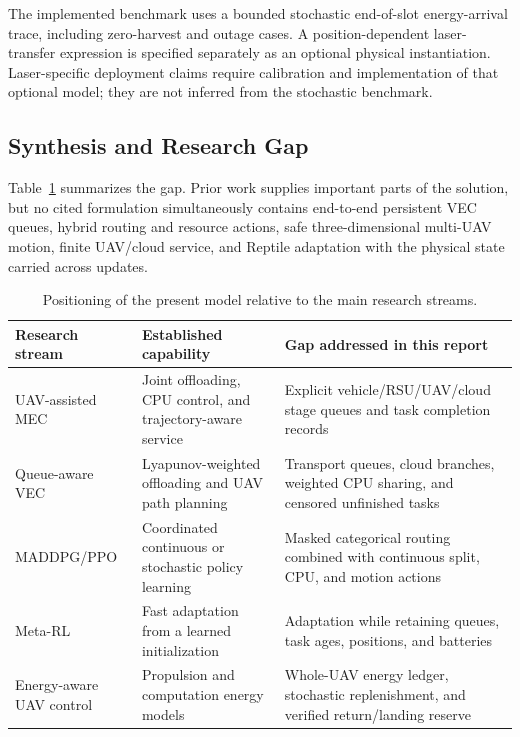 \documentclass[journal]{IEEEtran}
\begin{document}
The implemented benchmark uses a bounded stochastic end-of-slot
energy-arrival trace, including zero-harvest and outage cases.  A
position-dependent laser-transfer expression is specified separately
as an optional physical instantiation.  Laser-specific deployment
claims require calibration and implementation of that optional model;
they are not inferred from the stochastic benchmark.

\subsection{Synthesis and Research Gap}
Table~\ref{tab:scope_comparison} summarizes the gap.  Prior work
supplies important parts of the solution, but no cited formulation
simultaneously contains end-to-end persistent VEC queues, hybrid
routing and resource actions, safe three-dimensional multi-UAV motion,
finite UAV/cloud service, and Reptile adaptation with the physical
state carried across updates.

\begin{table}[t]
\centering
\caption{Positioning of the present model relative to the main research streams.}
\label{tab:scope_comparison}
\renewcommand{\arraystretch}{1.15}
\begin{tabular}{p{}p{}p{}}
\hline
\textbf{Research stream} & \textbf{Established capability} &
\textbf{Gap addressed in this report}\\
\hline
UAV-assisted MEC & Joint offloading, CPU control, and trajectory-aware
service & Explicit vehicle/RSU/UAV/cloud stage queues and task
completion records\\
Queue-aware VEC & Lyapunov-weighted offloading and UAV path planning &
Transport queues, cloud branches, weighted CPU sharing, and censored
unfinished tasks\\
MADDPG/PPO & Coordinated continuous or stochastic policy learning &
Masked categorical routing combined with continuous split, CPU, and
motion actions\\
Meta-RL & Fast adaptation from a learned initialization & Adaptation
while retaining queues, task ages, positions, and batteries\\
Energy-aware UAV control & Propulsion and computation energy models &
Whole-UAV energy ledger, stochastic replenishment, and verified
return/landing reserve\\
\hline
\end{tabular}
\end{table}
\end{document}
